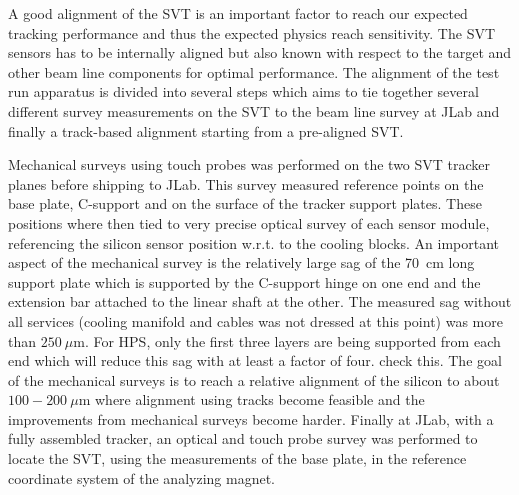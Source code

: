 A good alignment of the SVT is an important factor to reach our expected tracking performance 
and thus the expected physics reach sensitivity. The SVT sensors has to be internally aligned but 
also known with respect to the target and other beam line components for optimal performance. 
The alignment of the test run apparatus is divided into several steps which aims to tie together 
several different survey measurements on the SVT to the beam line survey at JLab and finally 
a track-based alignment starting from a pre-aligned SVT. 

Mechanical surveys using touch probes was performed on the two SVT tracker planes before 
shipping to JLab. This survey measured reference points on the base plate, C-support and on the surface of the tracker support plates. These positions where then tied to very precise optical 
survey of each sensor module, referencing the silicon sensor position w.r.t. to the cooling blocks. 
An important aspect of the mechanical survey is the relatively large sag of 
the 70~cm long support plate which is supported by the C-support hinge on one end and the 
extension bar attached to the linear shaft at the other. The measured sag without all services 
(cooling manifold and cables was not dressed at this point) was more than $250~\mu$m.  
For HPS, only the first three layers are being supported from each end which will reduce this 
sag with at least a factor of four. {\color{red} check this}. The goal of the mechanical surveys is 
to reach a relative alignment of the 
silicon to about $100-200~\mu$m where alignment using tracks become feasible and the 
improvements from mechanical surveys become harder. Finally at JLab, with a fully assembled 
tracker, an optical and touch probe survey was performed to locate 
the SVT, using the measurements of the base plate, in the reference coordinate system of 
the analyzing magnet. 

